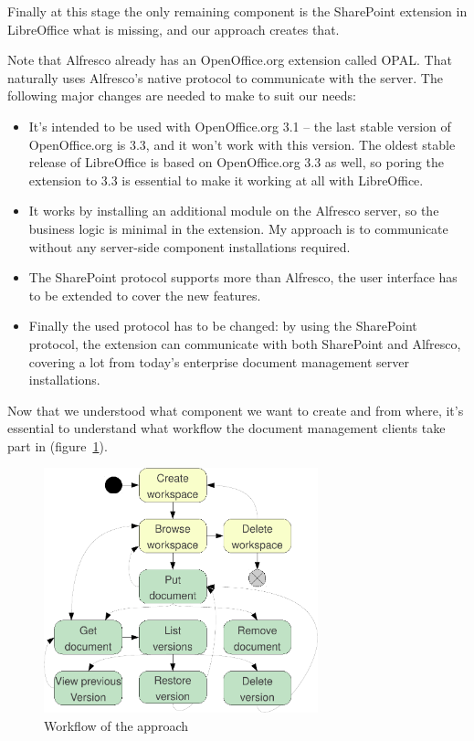 Finally at this stage the only remaining component is the SharePoint extension
in LibreOffice what is missing, and our approach creates that.

Note that Alfresco already has an OpenOffice.org extension called
OPAL\cite{opal}. That naturally uses Alfresco's native protocol to communicate
with the server. The following major changes are needed to make to suit our
needs:

\begin{itemize}
\item It's intended to be used with OpenOffice.org 3.1 -- the last stable
version of OpenOffice.org is 3.3, and it won't work with this version. The
oldest stable release of LibreOffice is based on OpenOffice.org 3.3 as well, so
poring the extension to 3.3 is essential to make it working at all with
LibreOffice.
\item It works by installing an additional module on the Alfresco server, so
the business logic is minimal in the extension. My approach is to communicate
without any server-side component installations required.
\item The SharePoint protocol supports more than Alfresco, the user interface
has to be extended to cover the new features.
\item Finally the used protocol has to be changed: by using the SharePoint
protocol, the extension can communicate with both SharePoint and Alfresco,
covering a lot from today's enterprise document management server
installations.
\end{itemize}

Now that we understood what component we want to create and from where, it's
essential to understand what workflow the document management clients take part
in (figure~\ref{fig:overview-workflow}).

\begin{figure}[H]
\centering
\includegraphics[width=300px,keepaspectratio]{overview-workflow.pdf}
\caption{Workflow of the approach}
\label{fig:overview-workflow}
\end{figure}

